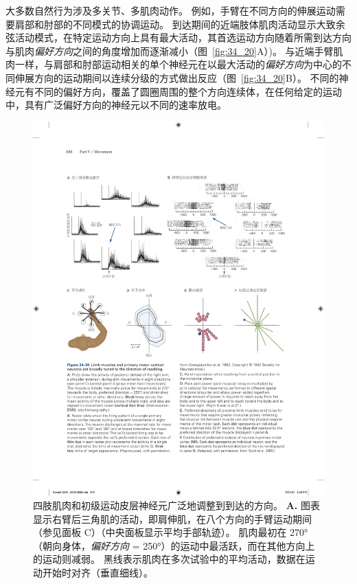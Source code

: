 大多数自然行为涉及多关节、多肌肉动作。
例如，手臂在不同方向的伸展运动需要肩部和肘部的不同模式的协调运动。
到达期间的近端肢体肌肉活动显示大致余弦活动模式，在特定运动方向上具有最大活动，其首选运动方向随着所需到达方向与肌肉\textit{偏好方向}之间的角度增加而逐渐减小（图~\ref{fig:34_20}A）)。
与近端手臂肌肉一样，与肩部和肘部运动相关的单个神经元在以最大活动的\textit{偏好方向}为中心的不同伸展方向的运动期间以连续分级的方式做出反应（图~\ref{fig:34_20}B）。
不同的神经元有不同的偏好方向，覆盖了圆圈周围的整个方向连续体，在任何给定的运动中，具有广泛偏好方向的神经元以不同的速率放电。


\begin{figure}[htbp]
	\centering
	\includegraphics[width=1.0\linewidth]{chap34/fig_34_20}
	\caption{四肢肌肉和初级运动皮层神经元广泛地调整到到达的方向。
		\textbf{A.} 图表显示右臂后三角肌的活动，即肩伸肌，在八个方向的手臂运动期间（参见面板 C）（中央面板显示平均手部轨迹）。
		肌肉最初在 270°（朝向身体，\textit{偏好方向} = 250°）的运动中最活跃，而在其他方向上的运动则减弱。
		黑线表示肌肉在多次试验中的平均活动，数据在运动开始时对齐（垂直细线）。
}
\end{figure}
